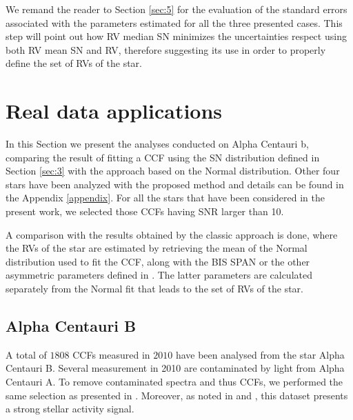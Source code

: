 \documentclass[11pt, oneside]{article}
\begin{document}
We remand the reader to Section \ref{sec:5} for the evaluation of the standard errors associated with the parameters estimated for all the three presented cases. This step will point out how RV median SN minimizes the uncertainties respect using both RV mean SN and RV, therefore suggesting its use in order to properly define the set of RVs of the star.

\section{Real data applications} \label{sec:4}

In this Section we present the analyses conducted on Alpha Centauri b, comparing the result of fitting a CCF using the SN distribution defined in Section \ref{sec:3} with the approach based on the Normal distribution. Other four stars have been analyzed with the proposed method and details can be found in the Appendix \ref{appendix}. For all the stars that have been considered in the present work, we selected those CCFs having SNR larger than 10.

 A comparison with the results obtained by the classic approach is done, where the RVs of the star are estimated by retrieving the mean of the Normal distribution used to fit the CCF, along with the BIS SPAN or the other asymmetric parameters defined in \citet{Figueira-2013}. The latter parameters are calculated separately from the Normal fit that leads to the set of RVs of the star.

\subsection{Alpha Centauri B} \label{sec:alphacentb}

A total of $1808$ CCFs measured in $2010$ have been analysed from the star Alpha Centauri B. Several measurement in 2010 are contaminated by light from Alpha Centauri A. To remove contaminated spectra and thus CCFs, we performed the same selection as presented in \citet{Dumusque-2012}. Moreover, as noted in \citet{Dumusque-2012} and \citet{Thompson-2017}, this dataset presents a strong stellar activity signal.
\end{document}
